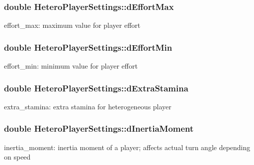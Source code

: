 \subsubsection[{\texorpdfstring{d\+Effort\+Max}{dEffortMax}}]{\setlength{\rightskip}{0pt plus 5cm}double Hetero\+Player\+Settings\+::d\+Effort\+Max}\hypertarget{classHeteroPlayerSettings_a10e6951be049003a8ffc56909a7f29dc}{}\label{classHeteroPlayerSettings_a10e6951be049003a8ffc56909a7f29dc}
effort\+\_\+max\+: maximum value for player effort 
\subsubsection[{\texorpdfstring{d\+Effort\+Min}{dEffortMin}}]{\setlength{\rightskip}{0pt plus 5cm}double Hetero\+Player\+Settings\+::d\+Effort\+Min}\hypertarget{classHeteroPlayerSettings_aeedb99aad3ee448861d0bc0e543caf81}{}\label{classHeteroPlayerSettings_aeedb99aad3ee448861d0bc0e543caf81}
effort\+\_\+min\+: minimum value for player effort 
\subsubsection[{\texorpdfstring{d\+Extra\+Stamina}{dExtraStamina}}]{\setlength{\rightskip}{0pt plus 5cm}double Hetero\+Player\+Settings\+::d\+Extra\+Stamina}\hypertarget{classHeteroPlayerSettings_a79c89d2b0733f8cd5e99ccfc1ddea52e}{}\label{classHeteroPlayerSettings_a79c89d2b0733f8cd5e99ccfc1ddea52e}
extra\+\_\+stamina\+: extra stamina for heterogeneous player 
\subsubsection[{\texorpdfstring{d\+Inertia\+Moment}{dInertiaMoment}}]{\setlength{\rightskip}{0pt plus 5cm}double Hetero\+Player\+Settings\+::d\+Inertia\+Moment}\hypertarget{classHeteroPlayerSettings_af7a5aad2979e605d3cedecd7b273420c}{}\label{classHeteroPlayerSettings_af7a5aad2979e605d3cedecd7b273420c}
inertia\+\_\+moment\+: inertia moment of a player; affects actual turn angle depending on speed 
